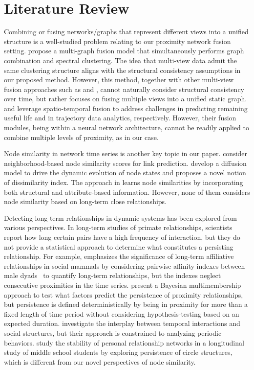 \section{Literature Review}
Combining or fusing networks/graphs that represent different views into a unified structure is a well-studied problem relating to our proximity network fusion setting. \citet{kang2020multi} propose a multi-graph fusion model that simultaneously performs graph combination and spectral clustering. The idea that multi-view data admit the same clustering structure aligns with the structural consistency assumptions in our proposed method. However, this method, together with other multi-view fusion approaches such as \citet{yang2019adaptive} and \citet{yang2024bidirectional}, cannot naturally consider structural consistency over time, but rather focuses on fusing multiple views into a unified static graph. \citet{zhang2021adaptive} and \citet{hu2022spatio} leverage spatio-temporal fusion to address challenges in predicting remaining useful life and in trajectory data analytics, respectively. However, their fusion modules, being within a neural network architecture, cannot be readily applied to combine multiple levels of proximity, as in our case.

Node similarity in network time series is another key topic in our paper. \citet{gunecs2016link} consider neighborhood-based node similarity scores for link prediction. \citet{yang2019time} develop a diffusion model to drive the dynamic evolution of node states and proposes a novel notion of dissimilarity index. The approach in \citet{meng2018coupled} learns node similarities by incorporating both structural and attribute-based information. However, none of them considers node similarity based on long-term close relationships.

Detecting long-term relationships in dynamic systems has been explored from various perspectives. In long-term studies of primate relationships, scientists report how long certain pairs have a high frequency of interaction, but they do not provide a statistical approach to determine what constitutes a persisting relationship. For example,  \citet{mitani2009male} emphasizes the significance of long-term affiliative relationships in social mammals by considering pairwise affinity indexes between male dyads~\citep{pepper1999general} to quantify long-term relationships, but the indexes neglect consecutive proximities in the time series. \citet{derby2024female} present a Bayesian multimembership approach to test what factors predict the persistence of proximity relationships, but persistence is defined deterministically by being in proximity for more than a fixed length of time period without considering hypothesis-testing based on an expected duration. \citet{qin2019mining} investigate the interplay between temporal interactions and social structures, but their approach is constrained to analyzing periodic behaviors. \citet{escribano2023stability} study the stability of personal relationship networks in a longitudinal study of middle school students by exploring persistence of circle structures, which is different from our novel perspectives of node similarity.

